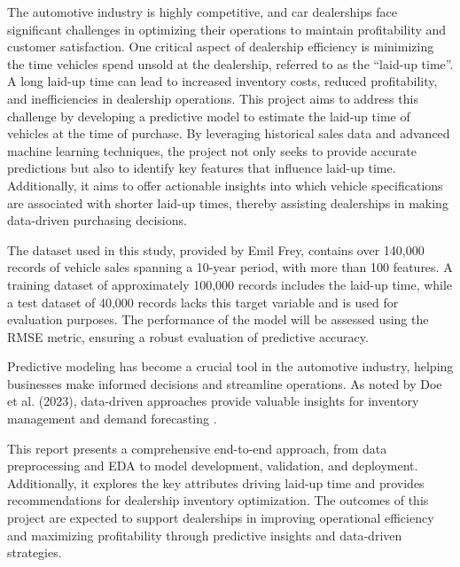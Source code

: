
The automotive industry is highly competitive, and car dealerships face significant challenges in optimizing their operations to maintain profitability and customer satisfaction.
One critical aspect of dealership efficiency is minimizing the time vehicles spend unsold at the dealership, referred to as the \enquote{laid-up time}.
A long laid-up time can lead to increased inventory costs, reduced profitability, and inefficiencies in dealership operations.
This project aims to address this challenge by developing a predictive model to estimate the laid-up time of vehicles at the time of purchase.
By leveraging historical sales data and advanced machine learning techniques, the project not only seeks to provide accurate predictions but also to identify key features that influence laid-up time.
Additionally, it aims to offer actionable insights into which vehicle specifications are associated with shorter laid-up times, thereby assisting dealerships in making data-driven purchasing decisions.

The dataset used in this study, provided by Emil Frey, contains over 140,000 records of vehicle sales spanning a 10-year period, with more than 100 features.
A training dataset of approximately 100,000 records includes the laid-up time, while a test dataset of 40,000 records lacks this target variable and is used for evaluation purposes.
The performance of the model will be assessed using the \ac{RMSE} metric, ensuring a robust evaluation of predictive accuracy.

Predictive modeling has become a crucial tool in the automotive industry, helping businesses make informed decisions and streamline operations.
As noted by Doe et al. (2023), data-driven approaches provide valuable insights for inventory management and demand forecasting \cite{doe2023predictive}.

This report presents a comprehensive end-to-end approach, from data preprocessing and \ac{EDA} to model development, validation, and deployment.
Additionally, it explores the key attributes driving laid-up time and provides recommendations for dealership inventory optimization.
The outcomes of this project are expected to support dealerships in improving operational efficiency and maximizing profitability through predictive insights and data-driven strategies.


